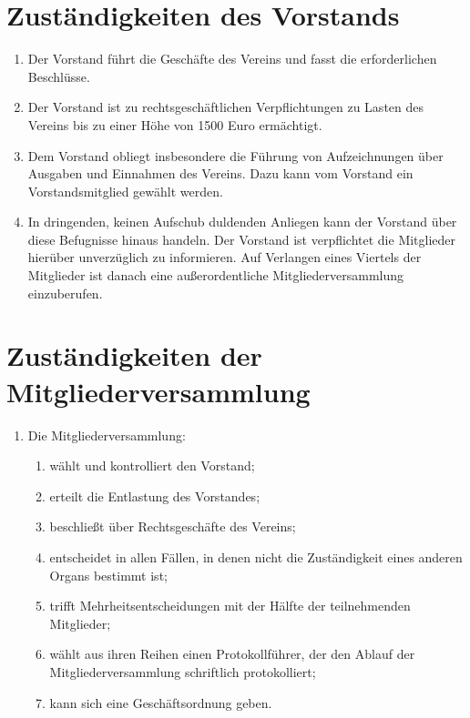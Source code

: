 \documentclass[ngerman]{article}
\begin{document}
\section{Zuständigkeiten des Vorstands}
\begin{enumerate}
  \item Der Vorstand führt die Geschäfte des Vereins und fasst die erforderlichen Beschlüsse.
  \item Der Vorstand ist zu rechtsgeschäftlichen Verpflichtungen zu Lasten des Vereins bis zu einer Höhe von 1500 Euro ermächtigt.
  \item Dem Vorstand obliegt insbesondere die Führung von Aufzeichnungen über Ausgaben und Einnahmen des Vereins.   Dazu kann vom Vorstand ein Vorstandsmitglied gewählt werden.
  \item In dringenden, keinen Aufschub duldenden Anliegen kann der Vorstand über diese Befugnisse hinaus handeln. Der Vorstand ist verpflichtet die Mitglieder hierüber unverzüglich zu informieren. Auf Verlangen eines Viertels der Mitglieder ist danach eine außerordentliche Mitgliederversammlung einzuberufen.
\end{enumerate}


\section{Zuständigkeiten der Mitgliederversammlung}
\begin{enumerate}
  \item Die Mitgliederversammlung:
  \begin{enumerate}
    \item wählt und kontrolliert den Vorstand;
    \item erteilt die Entlastung des Vorstandes;
    \item beschließt über Rechtsgeschäfte des Vereins;
    \item entscheidet in allen Fällen, in denen nicht die Zuständigkeit eines anderen Organs bestimmt ist;
    \item trifft Mehrheitsentscheidungen mit der Hälfte der teilnehmenden Mitglieder;
    \item wählt aus ihren Reihen einen Protokollführer, der den Ablauf der Mitgliederversammlung schriftlich protokolliert;
    \item kann sich eine Geschäftsordnung geben.
  \end{enumerate}
\end{enumerate}
\end{document}
